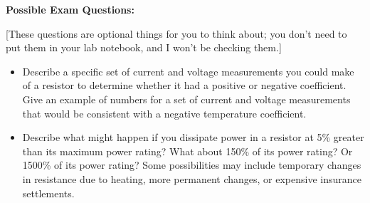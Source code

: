 \textbf{Possible Exam Questions:}

[These questions are optional things for you to think about; you don't need to put them in your lab notebook, and I won't be checking them.]

\begin{itemize}
\item Describe a specific set of current and voltage measurements you could make of a resistor to determine whether it had a positive or negative coefficient.  Give an example of numbers for a set of current and voltage measurements that would be consistent with a negative temperature coefficient.

\item Describe what might happen if you dissipate power in a resistor at 5\% greater than its maximum power rating?  What about 150\% of its power rating?  Or 1500\% of its power rating?  Some possibilities may include temporary changes in resistance due to heating, more permanent changes, or expensive insurance settlements.
\end{itemize}





